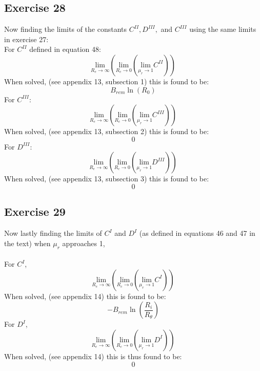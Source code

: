 \documentclass{article}
\begin{document}
\subsection{Exercise 28}
Now finding the limits of the constants $C^{II}, D^{III},$ and $C^{III}$ using the same limits in exercise 27:
\\
For $C^{II}$ defined in equation 48:
\begin{equation}
  \underset{{R_{e}\rightarrow\infty}}{\mathrm{lim}}\left(\underset{R_{c}\rightarrow0}{\mathrm{lim}}\left(\underset{\mu_{r}\rightarrow1}{\mathrm{lim}}C^{\mathit{II}}\right)\right)
\end{equation}
When solved, (see appendix 13, subsection 1) this is found to be:
\begin{equation}
    B_{rem}\ln{(R_{0})}
\end{equation}
For $C^{III}$:
\begin{equation}
  \underset{{R_{e}\rightarrow\infty}}{\mathrm{lim}}\left(\underset{R_{c}\rightarrow0}{\mathrm{lim}}\left(\underset{\mu_{r}\rightarrow1}{\mathrm{lim}}C^{\mathit{III}}\right)\right)
\end{equation}
When solved, (see appendix 13, subsection 2) this is found to be:
\begin{equation}
    0
\end{equation}
For $D^{III}$:
\begin{equation}
  \underset{{R_{e}\rightarrow\infty}}{\mathrm{lim}}\left(\underset{R_{c}\rightarrow0}{\mathrm{lim}}\left(\underset{\mu_{r}\rightarrow1}{\mathrm{lim}}D^{\mathit{III}}\right)\right)
\end{equation}
When solved, (see appendix 13, subsection 3) this is found to be:
\begin{equation}
    0
\end{equation}
\subsection{Exercise 29}
Now lastly finding the limits of $C^I$ and $D^I$ (as defined in equations 46 and 47 in the text) when $\mu_r$ approaches 1,
\\
\\
For $C^I$,
\begin{equation}
  \underset{{R_{e}\rightarrow\infty}}{\mathrm{lim}}\left(\underset{R_{c}\rightarrow0}{\mathrm{lim}}\left(\underset{\mu_{r}\rightarrow1}{\mathrm{lim}}C^{\mathit{I}}\right)\right)
\end{equation}
When solved, (see appendix 14) this is found to be:
\begin{equation}
    -B_{rem}\ln{(\frac{R_i}{R_\theta})}
\end{equation}
For $D^I$,
\begin{equation}
  \underset{{R_{e}\rightarrow\infty}}{\mathrm{lim}}\left(\underset{R_{c}\rightarrow0}{\mathrm{lim}}\left(\underset{\mu_{r}\rightarrow1}{\mathrm{lim}}D^{\mathit{I}}\right)\right)
\end{equation}
When solved, (see appendix 14) this is thus found to be:
\begin{equation}
    0
\end{equation}
\end{document}
